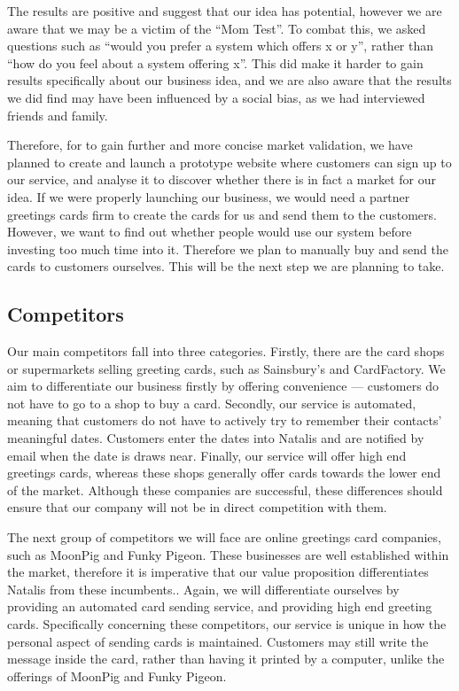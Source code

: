 \documentclass[10pt,a4paper]{article}
\begin{document}
The results are positive and suggest that our idea has potential, however we are aware that we may be a victim of the ``Mom Test''. To combat this, we asked questions such as ``would you prefer a system which offers x or y'', rather than ``how do you feel about a system offering x''. This did make it harder to gain results specifically about our business idea, and we are also aware that the results we did find may have been influenced by a social bias, as we had interviewed friends and family.

Therefore, for to gain further and more concise market validation, we have planned to create and launch a prototype website where customers can sign up to our service, and analyse it to discover whether there is in fact a market for our idea. If we were properly launching our business, we would need a partner greetings cards firm to create the cards for us and send them to the customers. However, we want to find out whether people would use our system before investing too much time into it. Therefore we plan to manually buy and send the cards to customers ourselves. This will be the next step we are planning to take.

\subsection*{Competitors}
Our main competitors fall into three categories. Firstly, there are the card shops or supermarkets selling greeting cards, such as Sainsbury's and CardFactory. We aim to differentiate our business firstly by offering convenience --- customers do not have to go to a shop to buy a card. Secondly, our service is automated, meaning that customers do not have to actively try to remember their contacts' meaningful dates. Customers enter the dates into Natalis and are notified by email when the date is draws near.  Finally, our service will offer high end greetings cards, whereas these shops generally offer cards towards the lower end of the market. Although these companies are successful, these differences should ensure that our company will not be in direct competition with them.

The next group of competitors we will face are online greetings card companies, such as MoonPig and Funky Pigeon. These businesses are well established within the market, therefore it is imperative that our value proposition differentiates Natalis from these incumbents..
Again, we will differentiate ourselves by providing an automated card sending service, and providing high end greeting cards. Specifically concerning these competitors, our service is unique in how the personal aspect of sending cards is maintained. Customers may still write the message inside the card, rather than having it printed by a computer, unlike the offerings of MoonPig and Funky Pigeon.
\end{document}
